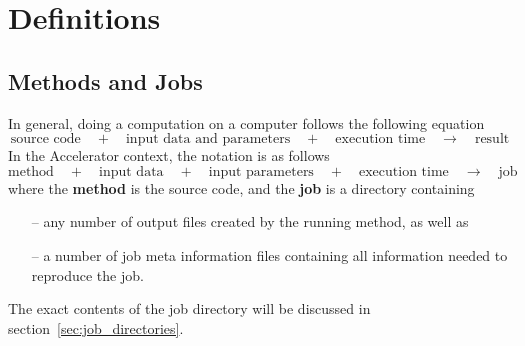 




\section{Definitions}

\subsection{Methods and Jobs}

In general, doing a computation on a computer follows the following
equation
\[
  \text{source code} \quad+\quad \text{input data and parameters}
  \quad+\quad \text{execution time} \quad\rightarrow\quad
  \text{result}
\]
In the Accelerator context, the notation is as follows
\[
  \text{method} \quad+\quad \text{input data} \quad+\quad \text{input
    parameters} \quad+\quad \text{execution time}
  \quad\rightarrow\quad \text{job}
\]
where the \textbf{method} is the source code, and the \textbf{job} is
a directory containing
\begin{itemize}
\item[--] any number of output files created by the running method, as well as
\item[--] a number of job meta information files containing all
  information needed to reproduce the job.
\end{itemize}
The exact contents of the job directory will be discussed in
section~\ref{sec:job_directories}.

